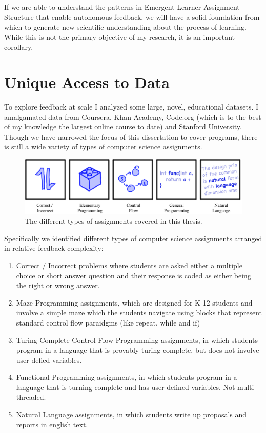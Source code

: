 If we are able to understand the patterns in Emergent Learner-Assignment Structure that enable autonomous feedback, we will have a solid foundation from which to generate new scientific understanding about the process of learning. While this is not the primary objective of my research, it is an important corollary.


\section{Unique Access to Data}

To explore feedback at scale I analyzed some large, novel, educational
datasets. I amalgamated data from Coursera, Khan Academy, Code.org (which is to the
best of my knowledge the largest online course to date) and Stanford University. Though we have narrowed the focus of this dissertation to cover programs, there is still a wide variety of types of computer science assignments. 

\begin{figure}[h]
\center
\includegraphics[width=1.0\textwidth]{img/assnType_all}
\caption{
The different types of assignments covered in this thesis.
}
\end{figure}

Specifically we identified different types of computer science assignments arranged in relative feedback complexity: 
\begin{enumerate}
\item Correct / Incorrect problems where students are asked either a multiple choice or short answer question and their response is coded as either being the right or wrong answer. 
\item Maze Programming assignments, which are designed for K-12 students and involve a simple maze which the students navigate using blocks that represent standard control flow paraidgms (like repeat, while and if)
\item Turing Complete Control Flow Programming assignments, in which students program in a language that is provably turing complete, but does not involve user defied variables.
\item Functional Programming assignments, in which students program in a language that is turning complete and has user defined variables. Not multi-threaded.
\item Natural Language assignments, in which students write up proposals and reports in english text.	
\end{enumerate}

